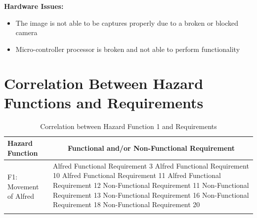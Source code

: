 \documentclass [10pt]{article}
\begin{document}
	\textbf{Hardware Issues:}
		\begin {itemize}
			\item The image is not able to be captures properly due to a broken or blocked camera
			\item Micro-controller processor is broken and not able to perform functionality
		\end {itemize}



\newpage



\section{Correlation Between Hazard Functions and  Requirements}


\begin{longtable}{| p{ } | p{ } |}
\hline 
\centering \textbf{Hazard Function} & 
\multicolumn{1}{c}{\textbf {Functional and/or Non-Functional Requirement}}\\ \hline
\multirow{7}{*}{F1: Movement of Alfred}& 
		{Alfred Functional Requirement 3 \newline
		Alfred Functional Requirement 10 \newline
		Alfred Functional Requirement 11 \newline
		Alfred Functional Requirement 12 \newline
		Non-Functional Requirement 11 \newline
		Non-Functional Requirement 13 \newline
		Non-Functional Requirement 16 \newline
		Non-Functional Requirement 18 \newline
		Non-Functional Requirement 20} \\ 
\hline 
\caption{Correlation between Hazard Function 1 and Requirements}  
\end{longtable}


\end{document}
